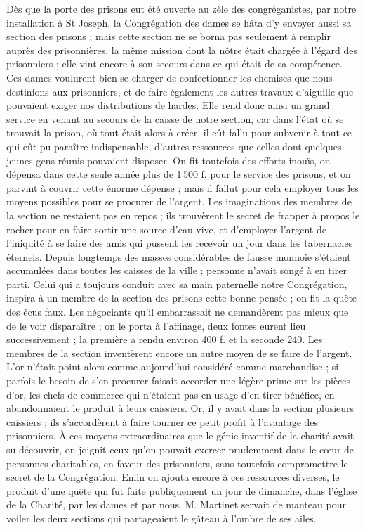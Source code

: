 Dès que la porte des prisons eut été ouverte au zèle des congréganistes, par notre installation à St Joseph, la Congrégation des dames se hâta d'y envoyer aussi sa section des prisons ; mais cette section ne se borna pas seulement à remplir auprès des prisonnières, la même mission dont la nôtre était chargée à l'égard des prisonniers ; elle vint encore à son secours dans ce qui était de sa compétence. Ces dames voulurent bien se charger de confectionner les chemises que nous destinions aux prisonniers, et de faire également les autres travaux d'aiguille que pouvaient exiger nos distributions de hardes. Elle rend donc ainsi un grand service en venant au secours de la caisse de notre section, car dans l'état où se trouvait la prison, où tout était alors à créer, il eût fallu pour subvenir à tout ce qui eût pu paraître indispensable, d'autres ressources que celles dont quelques jeunes gens réunis pouvaient disposer. On fit toutefois des efforts inouïs, on dépensa dans cette seule année plus de 1\,500 f. pour le
service des prisons, et on parvint à couvrir cette énorme dépense ; mais il fallut pour cela employer tous les moyens possibles pour se procurer de l'argent. Les imaginations des membres de la section ne restaient pas en repos ; ils trouvèrent le secret de frapper à propos le rocher pour en faire sortir une source d'eau vive, et d'employer l'argent de l'iniquité à se faire des amis qui pussent les recevoir un jour dans les tabernacles éternels. Depuis longtemps des masses considérables de fausse monnoie s'étaient accumulées dans toutes les caisses de la ville ; personne n'avait songé à en tirer parti. Celui qui a toujours conduit avec sa main paternelle notre Congrégation, inspira à un membre de la section des prisons cette bonne pensée ; on fit la quête des écus faux. Les négociants qu'il embarrassait ne demandèrent pas mieux que de le voir disparaître ; on le porta à l'affinage, deux fontes eurent lieu successivement ; la première a rendu environ 400 f. et la seconde 240. Les membres de la section inventèrent encore un autre moyen de se faire de l'argent. L'or n'était point alors comme aujourd'hui considéré comme marchandise ; si parfois le besoin de s'en procurer faisait accorder une légère prime sur les pièces d'or, les chefs de commerce qui n'étaient pas en usage d'en tirer bénéfice, en abandonnaient le produit à leurs caissiers. Or, il y avait dans la section plusieurs caissiers ; ils s'accordèrent à faire tourner ce petit profit à l'avantage des prisonniers. À ces moyens extraordinaires que le génie inventif de la charité avait su découvrir, on joignit ceux qu'on pouvait exercer prudemment dans le cœur de
personnes charitables, en faveur des prisonniers, sans toutefois compromettre le secret de la Congrégation. Enfin on ajouta encore à ces ressources diverses, le produit d'une quête qui fut faite publiquement un jour de dimanche, dans l'église de la Charité, par les dames et par nous. M. Martinet servait de manteau pour voiler les deux sections qui partageaient le gâteau à l'ombre de ses ailes.

